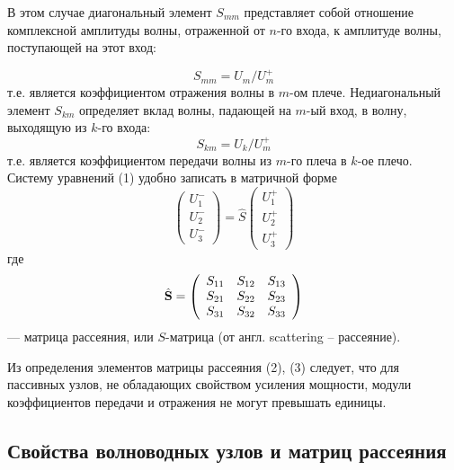 ﻿\documentclass[a4paper,11pt]{article}
\begin{document}
В этом случае диагональный элемент $S_{mm}$ представляет собой отношение комплексной амплитуды волны, отраженной от $n$-го входа, к амплитуде волны, поступающей на этот вход:

\begin{equation}
	S _ { m m } = U _ { m } / U _ { m } ^ { + }
\end{equation}
т.е. является коэффициентом отражения волны в $m$-ом плече. Недиагональный элемент $S_{km}$ определяет вклад волны, падающей на $m$-ый вход, в волну, выходящую из $k$-го входа:
\begin{equation}
	S _ { k m } = U _ { k } / U _ { m } ^ { + }
\end{equation}
т.е. является коэффициентом передачи волны из $m$-го плеча в $k$-ое плечо. Систему уравнений (1) удобно записать в матричной форме
\begin{equation}
	\left( \begin{array} { c } { U _ { 1 } ^ { - } } \\ { U _ { 2 } ^ { - } } \\ { U _ { 3 } ^ { - } } \end{array} \right) = \hat { S } \left( \begin{array} { l } { U _ { 1 } ^ { + } } \\ { U _ { 2 } ^ { + } } \\ { U _ { 3 } ^ { + } } \end{array} \right)
\end{equation}
где
\begin{equation}
	\hat { \mathbf { S } } = \left( \begin{array} { c c c } { S _ { 11 } } & { S _ { 12 } } & { S _ { 13 } } \\ { S _ { 21 } } & { S _ { 22 } } & { S _ { 23 } } \\ { S _ { 31 } } & { S _ { 32 } } & { S _ { 33 } } \end{array} \right)
\end{equation}
--- матрица рассеяния, или $S$-матрица (от англ. scattering -- рассеяние).

Из определения элементов матрицы рассеяния (2), (3) следует, что для пассивных узлов, не обладающих свойством усиления мощности, модули коэффициентов передачи и отражения не могут превышать единицы.

\subsection{Свойства волноводных узлов и матриц рассеяния}
\end{document}
